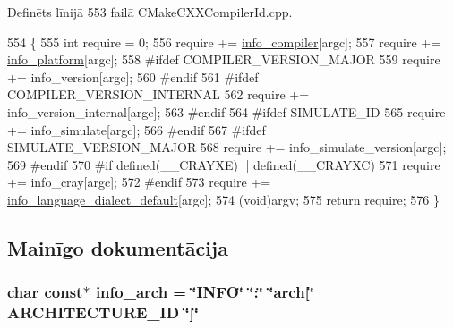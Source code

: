 Definēts līnijā 553 failā C\+Make\+C\+X\+X\+Compiler\+Id.\+cpp.


\begin{DoxyCode}
554 \{
555   \textcolor{keywordtype}{int} require = 0;
556   require += \hyperlink{build_2_c_make_files_23_85_81_2_compiler_id_c_x_x_2_c_make_c_x_x_compiler_id_8cpp_a4b0efeb7a5d59313986b3a0390f050f6}{info\_compiler}[argc];
557   require += \hyperlink{build_2_c_make_files_23_85_81_2_compiler_id_c_x_x_2_c_make_c_x_x_compiler_id_8cpp_a2321403dee54ee23f0c2fa849c60f7d4}{info\_platform}[argc];
558 \textcolor{preprocessor}{#ifdef COMPILER\_VERSION\_MAJOR}
559   require += info\_version[argc];
560 \textcolor{preprocessor}{#endif}
561 \textcolor{preprocessor}{#ifdef COMPILER\_VERSION\_INTERNAL}
562   require += info\_version\_internal[argc];
563 \textcolor{preprocessor}{#endif}
564 \textcolor{preprocessor}{#ifdef SIMULATE\_ID}
565   require += info\_simulate[argc];
566 \textcolor{preprocessor}{#endif}
567 \textcolor{preprocessor}{#ifdef SIMULATE\_VERSION\_MAJOR}
568   require += info\_simulate\_version[argc];
569 \textcolor{preprocessor}{#endif}
570 \textcolor{preprocessor}{#if defined(\_\_CRAYXE) || defined(\_\_CRAYXC)}
571   require += info\_cray[argc];
572 \textcolor{preprocessor}{#endif}
573   require += \hyperlink{build_2_c_make_files_23_85_81_2_compiler_id_c_x_x_2_c_make_c_x_x_compiler_id_8cpp_a1ce162bad2fe6966ac8b33cc19e120b8}{info\_language\_dialect\_default}[argc];
574   (void)argv;
575   \textcolor{keywordflow}{return} require;
576 \}
\end{DoxyCode}


\subsection{Mainīgo dokumentācija}
\subsubsection[{\texorpdfstring{info\+\_\+arch}{info_arch}}]{\setlength{\rightskip}{0pt plus 5cm}char const$\ast$ info\+\_\+arch = \char`\"{}I\+N\+FO\char`\"{} \char`\"{}\+:\char`\"{} \char`\"{}arch\mbox{[}\char`\"{} A\+R\+C\+H\+I\+T\+E\+C\+T\+U\+R\+E\+\_\+\+ID \char`\"{}\mbox{]}\char`\"{}}\hypertarget{cmake-build-debug_2_c_make_files_23_810_82_2_compiler_id_c_x_x_2_c_make_c_x_x_compiler_id_8cpp_a59647e99d304ed33b15cb284c27ed391}{}\label{cmake-build-debug_2_c_make_files_23_810_82_2_compiler_id_c_x_x_2_c_make_c_x_x_compiler_id_8cpp_a59647e99d304ed33b15cb284c27ed391}


